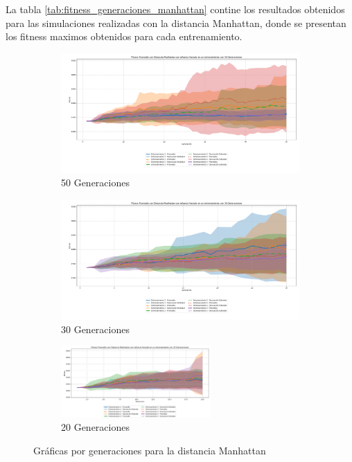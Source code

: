\documentclass[conference]{IEEEtran}
\begin{document}
La tabla \ref{tab:fitness_generaciones_manhattan} contine los resultados obtenidos para las simulaciones realizadas con la distancia Manhattan, donde se presentan los fitness maximos obtenidos para cada entrenamiento.
\begin{figure}[ht]
    \centering
    \begin{subfigure}{0.3\textwidth}
        \centering
        \includegraphics[width=\textwidth]{Manhattan/Fitness_Acumulado_Manh_50Gen.png}
        \caption{50 Generaciones}
        \label{fig:manh_50gen}
    \end{subfigure}
    \hfill
    \begin{subfigure}{0.3\textwidth}
        \centering
        \includegraphics[width=\textwidth]{Manhattan/Fitness_Acumulado_Manh30Gen.png}
        \caption{30 Generaciones}
        \label{fig:manh_30gen}
    \end{subfigure}
    \hfill
    \begin{subfigure}{0.3\textwidth}
        \centering
        \includegraphics[width=\textwidth, height=2.74cm]{Manhattan/Fitness_Acumulado_Manh_20Gen.png}
        \caption{20 Generaciones}
        \label{fig:manh_20gen}
    \end{subfigure}
    \caption{Gráficas por generaciones para la distancia Manhattan}
    \label{fig:graficas_generales_manhattan}
\end{figure}
\end{document}

